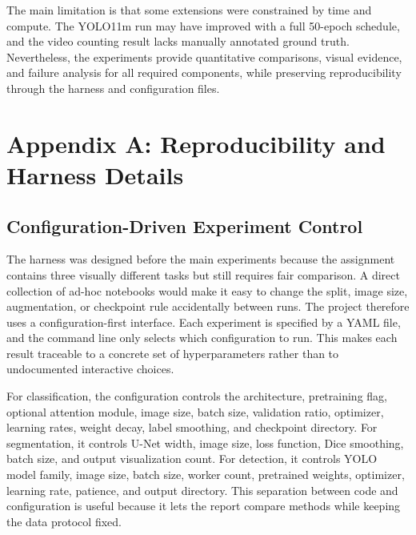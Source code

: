 \documentclass[10pt,twocolumn]{article}
\begin{document}
The main limitation is that some extensions were constrained by time and compute. The YOLO11m run may have improved with a full 50-epoch schedule, and the video counting result lacks manually annotated ground truth. Nevertheless, the experiments provide quantitative comparisons, visual evidence, and failure analysis for all required components, while preserving reproducibility through the harness and configuration files.

\appendix

\section{Appendix A: Reproducibility and Harness Details}

\subsection{Configuration-Driven Experiment Control}

The harness was designed before the main experiments because the assignment contains three visually different tasks but still requires fair comparison. A direct collection of ad-hoc notebooks would make it easy to change the split, image size, augmentation, or checkpoint rule accidentally between runs. The project therefore uses a configuration-first interface. Each experiment is specified by a YAML file, and the command line only selects which configuration to run. This makes each result traceable to a concrete set of hyperparameters rather than to undocumented interactive choices.

For classification, the configuration controls the architecture, pretraining flag, optional attention module, image size, batch size, validation ratio, optimizer, learning rates, weight decay, label smoothing, and checkpoint directory. For segmentation, it controls U-Net width, image size, loss function, Dice smoothing, batch size, and output visualization count. For detection, it controls YOLO model family, image size, batch size, worker count, pretrained weights, optimizer, learning rate, patience, and output directory. This separation between code and configuration is useful because it lets the report compare methods while keeping the data protocol fixed.
\end{document}
